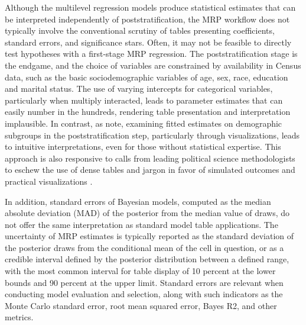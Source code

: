 Although the multilevel regression models produce statistical estimates that can be interpreted independently of poststratification, the MRP workflow does not typically involve the conventional scrutiny of tables presenting coefficients, standard errors, and significance stars. Often, it may not be feasible to directly test hypotheses with a first-stage MRP regression. The poststratification stage is the endgame, and the choice of variables are constrained by availability in Census data, such as the basic sociodemographic variables of age, sex, race, education and marital status. The use of varying intercepts for categorical variables, particularly when multiply interacted, leads to parameter estimates that can easily number in the hundreds, rendering table presentation and interpretation implausible. In contrast, as \citet{ghitza_deep_2013} note, examining fitted estimates on demographic subgroups in the poststratification step, particularly through visualizations, leads to intuitive interpretations, even for those without statistical expertise. This approach is also responsive to calls from leading political science methodologists to eschew the use of dense tables and jargon in favor of simulated outcomes and practical visualizations \citep{king_making_2000, gelman_lets_2002, kastellec_using_2007}. 

In addition, standard errors of Bayesian models, computed as the median absolute deviation (MAD) of the posterior from the median value of draws, do not offer the same interpretation as standard model table applications. The uncertainty of MRP estimates is typically reported as the standard deviation of the posterior draws from the conditional mean of the cell in question, or as a credible interval defined by the posterior distribution between a defined range, with the most common interval for table display of 10 percent at the lower bounds and 90 percent at the upper limit. Standard errors are relevant when conducting model evaluation and selection, along with such indicators as the Monte Carlo standard error, root mean squared error, Bayes R2, and other metrics.  

